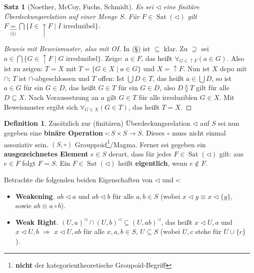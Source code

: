 \documentclass[headsepline=true,DIV=11]{scrartcl}
\newtheorem*{theorem}{Satz}
\theoremstyle{definition}
\newtheorem*{definition}{Definition}
\newenvironment{gelaber}{}{}
\newcommand{\Sat}{\operatorname{Sat}}
\begin{document}
\begin{theorem}[Noether, McCoy, Fuchs, Schmidt]
  Es sei $\lhd$ eine finitäre Überdeckungsrelation auf einer Menge $S$. Für $F\in\Sat(\lhd)$ gilt $F\underbrace{=}_{\mbox{(§)}}\bigcap\{I\in\uparrow
  F\mid I\mbox{ irreduzibel}\}$.
\end{theorem}

\begin{proof}[Beweis mit Beweismuster, also mit OI]
  In (§) ist $\subseteq$ klar. Zu $\supseteq$ sei $a\in\bigcap\{G\in\uparrow F\mid G\mbox{ irreduzibel}\}$. Zeige: $a\in F$, das heißt
  $\forall_{G\in\uparrow F}(a\in G)$. Also ist zu zeigen: $T=X$ mit $T=\{G\in X\mid a\in G\}$ und $X=\uparrow F$. Nun ist $X$ dcpo mit $\cap$; $T$ ist
  $\cap$-abgeschlossen und $T$ offen: Ist $\bigcup D\in T$, das heißt $a\in\bigcup D$, so
  ist $a\in G$ für ein $G\in D$, das heißt $G\in T$ für ein $G\in D$, also $D\between T$ gilt für alle $D\subseteq X$. Nach Voraussetzung an $a$ gilt
  $G\in T$ für alle irreduziblen $G\in X$. Mit Beweismuster ergibt sich $\forall_{G\in X}(G\in T)$, das heißt $T=X$.
\end{proof}

\begin{definition}
  Zusätzlich zur (finitären) Überdeckungsrelation $\lhd$ auf $S$ sei nun gegeben eine {\bf binäre Operation} $\circ:S\times S\rightarrow S$. Dieses
  $\circ$ muss nicht einmal assoziativ sein. $(S,\circ)$ Grouppoid\footnote{{\bf nicht} der kategorientheoretische Groupoid-Begriff}/Magma. Ferner sei
  gegeben ein {\bf ausgezeichnetes Element} $e\in S$ derart, dass für jedes $F\in\Sat(\lhd)$ gilt: aus $e\in F$ folgt $F=S$. Ein $F\in\Sat(\lhd)$
  heißt {\bf eigentlich}, wenn $e\not\in F$.
\end{definition}

\begin{gelaber}
  Betrachte die folgenden beiden Eigenschaften von $\lhd$ und $\circ$:
  \begin{itemize}
    \item {\bf Weakening}. $ab\lhd a$ und $ab\lhd b$ für alle $a,b\in S$ (wobei $x\lhd y \equiv x\lhd\{y\}$, sowie $ab\equiv a\circ b$).
    \item {\bf Weak Right}. $(U,a)^\lhd\cap (U,b)^\lhd\subseteq (U,ab)^\lhd$, das heißt $x\lhd U, a$ und $x\lhd U,b$ $\Rightarrow$ $x\lhd U,ab$ für
      alle $x,a,b\in S$, $U\subseteq S$ (wobei $U,c$ stehe für $U\cup\{c\}$).
  \end{itemize}
\end{gelaber}
\end{document}
